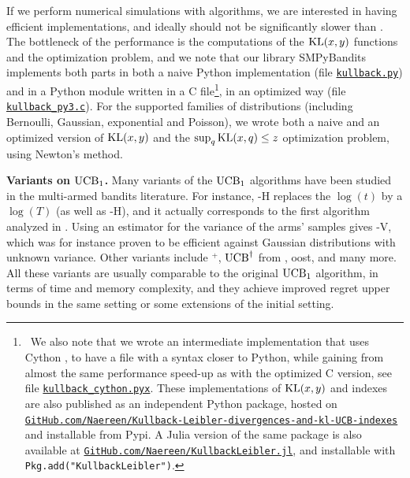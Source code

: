 If we perform numerical simulations with \klUCB{} algorithms, we are interested in having efficient implementations, and ideally \klUCB{} should not be significantly slower than \UCB. The bottleneck of the performance is the computations of the $\mathrm{KL}(x,y)$ functions and the optimization problem,
and we note that our library SMPyBandits implements both parts in both a naive Python implementation (file \href{https://github.com/SMPyBandits/SMPyBandits/blob/master/SMPyBandits/Policies/kullback.py}{\texttt{kullback.py}}) and in a Python module written in a
C file\footnote{~We also note that we wrote an intermediate implementation that uses Cython \cite{cython}, to have a file with a syntax closer to Python, while gaining from almost the same performance speed-up as with the optimized C version, see file \href{https://github.com/SMPyBandits/SMPyBandits/blob/master/SMPyBandits/Policies/kullback_cython.pyx}{\texttt{kullback\_cython.pyx}}.
    These implementations of $\mathrm{KL}(x,y)$ and \klUCB{} indexes are also published as an independent Python package, hosted on \href{https://github.com/Naereen/Kullback-Leibler-divergences-and-kl-UCB-indexes}{\texttt{GitHub.com/Naereen/Kullback-Leibler-divergences-and-kl-UCB-indexes}} and installable from Pypi.
    A Julia version of the same package is also available at \href{https://github.com/Naereen/KullbackLeibler.jl}{\texttt{GitHub.com/Naereen/KullbackLeibler.jl}},
    and installable with \texttt{Pkg.add("KullbackLeibler")}.
},
in an optimized way (file \href{https://github.com/SMPyBandits/SMPyBandits/blob/master/SMPyBandits/Policies/C/kullback_py3.c}{\texttt{kullback\_py3.c}}).
For the supported families of distributions (including Bernoulli, Gaussian, exponential and Poisson), we wrote both a naive and an optimized version of $\mathrm{KL}(x,y)$ and the $\sup_q \mathrm{KL}(x,q) \leq z$ optimization problem, using Newton's method.


\textbf{Variants on $\mathrm{UCB}_1$.}
%
Many variants of the $\mathrm{UCB}_1$ algorithms have been studied in the multi-armed bandits literature.
For instance, \UCB-H replaces the $\log(t)$ by a $\log(T)$ (as well as \klUCB-H), and it actually corresponds to the first algorithm analyzed in \cite{Auer02}.
Using an estimator for the variance of the arms' samples gives \UCB-V, which was for instance proven to be efficient against Gaussian distributions with unknown variance.
Other variants include \UCB$^+$, $\mathrm{UCB}^{\dagger}$ from \cite{Lattimore2018refining}, {\UCB}oost, and many more.
%
All these variants are usually comparable to the original $\mathrm{UCB}_1$ algorithm, in terms of time and memory complexity, and they achieve improved regret upper bounds in the same setting or some extensions of the initial setting.


